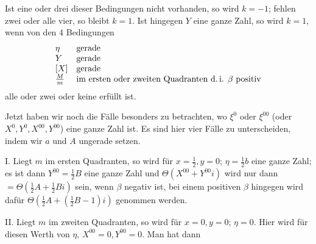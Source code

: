 Ist eine oder drei dieser Bedingungen nicht vorhanden, so wird $k=-1$; fehlen zwei oder alle vier, so bleibt $k=1$. Ist hingegen $Y$ eine ganze Zahl, so wird $k=1$, wenn von den $4$ Bedingungen
\[
\begin{array}{ll}
\eta&\text{gerade}\\
Y&\text{gerade}\\
\relax[X]&\text{gerade}\\
\frac{M}{m}&\text{im ersten oder zweiten Quadranten d.\,i. }\beta\text{ positiv}
\end{array}
\]
alle oder zwei oder keine erfüllt ist.

Jetzt haben wir noch die Fälle besonders zu betrachten, wo $\xi^0$ oder $\xi^{00}$ (oder $X^0,Y^0,X^{00},Y^{00}$) eine ganze Zahl ist. Es sind hier vier Fälle zu unterscheiden, indem wir $a$ und $A$ ungerade setzen.

I. Liegt $m$ im ersten Quadranten, so wird für $x=\frac12,y=0$; $\eta=\frac12b$ eine ganze Zahl; es ist dann $Y^{00}=\frac12B$ eine ganze Zahl und $\Theta(X^{00}+Y^{00}i)$ wird nur dann $=\Theta(\frac12A+\frac12Bi)$ sein, wenn $\beta$ negativ ist, bei einem positiven $\beta$ hingegen wird dafür $\Theta(\frac12A+(\frac12B-1)i)$ genommen werden.

II. Liegt $m$ im zweiten Quadranten, so wird für $x=0,y=0$; $\eta=0$. Hier wird für diesen Werth von $\eta$, $X^{00}=0,Y^{00}=0$. Man hat dann

